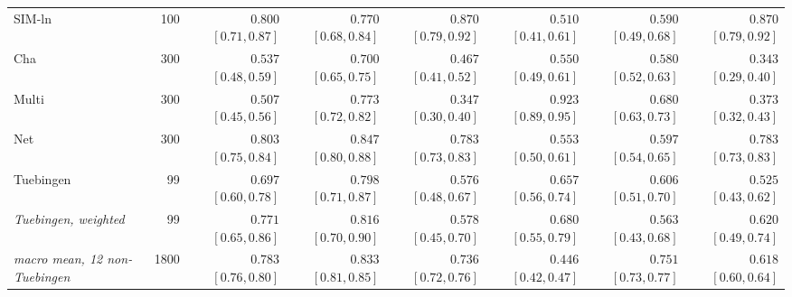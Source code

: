 \begin{table}[!t]
{\begin{tabular}{l r rrrrrr}
SIM-ln & 100 & $0.800$ {\tiny$[0.71,0.87]$} & $0.770$ {\tiny$[0.68,0.84]$} & $0.870$ {\tiny$[0.79,0.92]$} & $0.510$ {\tiny$[0.41,0.61]$} & $0.590$ {\tiny$[0.49,0.68]$} & $0.870$ {\tiny$[0.79,0.92]$}\\
Cha & 300 & $0.537$ {\tiny$[0.48,0.59]$} & $0.700$ {\tiny$[0.65,0.75]$} & $0.467$ {\tiny$[0.41,0.52]$} & $0.550$ {\tiny$[0.49,0.61]$} & $0.580$ {\tiny$[0.52,0.63]$} & $0.343$ {\tiny$[0.29,0.40]$}\\
Multi & 300 & $0.507$ {\tiny$[0.45,0.56]$} & $0.773$ {\tiny$[0.72,0.82]$} & $0.347$ {\tiny$[0.30,0.40]$} & $0.923$ {\tiny$[0.89,0.95]$} & $0.680$ {\tiny$[0.63,0.73]$} & $0.373$ {\tiny$[0.32,0.43]$}\\
Net & 300 & $0.803$ {\tiny$[0.75,0.84]$} & $0.847$ {\tiny$[0.80,0.88]$} & $0.783$ {\tiny$[0.73,0.83]$} & $0.553$ {\tiny$[0.50,0.61]$} & $0.597$ {\tiny$[0.54,0.65]$} & $0.783$ {\tiny$[0.73,0.83]$}\\
Tuebingen & 99 & $0.697$ {\tiny$[0.60,0.78]$} & $0.798$ {\tiny$[0.71,0.87]$} & $0.576$ {\tiny$[0.48,0.67]$} & $0.657$ {\tiny$[0.56,0.74]$} & $0.606$ {\tiny$[0.51,0.70]$} & $0.525$ {\tiny$[0.43,0.62]$}\\
\midrule
\emph{Tuebingen, weighted} & 99 & $0.771$ {\tiny$[0.65,0.86]$} & $0.816$ {\tiny$[0.70,0.90]$} & $0.578$ {\tiny$[0.45,0.70]$} & $0.680$ {\tiny$[0.55,0.79]$} & $0.563$ {\tiny$[0.43,0.68]$} & $0.620$ {\tiny$[0.49,0.74]$}\\
\midrule
\emph{macro mean, 12 non-Tuebingen} & 1800 & $0.783$ {\tiny$[0.76,0.80]$} & $0.833$ {\tiny$[0.81,0.85]$} & $0.736$ {\tiny$[0.72,0.76]$} & $0.446$ {\tiny$[0.42,0.47]$} & $0.751$ {\tiny$[0.73,0.77]$} & $0.618$ {\tiny$[0.60,0.64]$}\\
\bottomrule
\end{tabular}}

\vspace{6pt}



\end{table}

